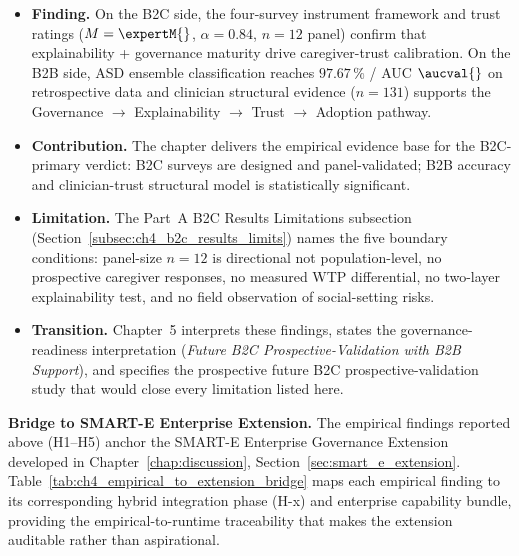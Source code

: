 \begin{itemize}[leftmargin=*, itemsep=2pt]
    \item \textbf{Finding.} On the B2C side, the four-survey instrument framework and trust ratings ($M = \expertM{}$, $\alpha = 0.84$, $n = 12$ panel) confirm that explainability + governance maturity drive caregiver-trust calibration. On the B2B side, ASD ensemble classification reaches $97.67\,\%$ / AUC $\aucval{}$ on retrospective data and clinician structural evidence ($n = 131$) supports the Governance $\to$ Explainability $\to$ Trust $\to$ Adoption pathway.
    \item \textbf{Contribution.} The chapter delivers the empirical evidence base for the B2C-primary verdict: B2C surveys are designed and panel-validated; B2B accuracy and clinician-trust structural model is statistically significant.
    \item \textbf{Limitation.} The Part~A B2C Results Limitations subsection (Section~\ref{subsec:ch4_b2c_results_limits}) names the five boundary conditions: panel-size $n = 12$ is directional not population-level, no prospective caregiver responses, no measured WTP differential, no two-layer explainability test, and no field observation of social-setting risks.
    \item \textbf{Transition.} Chapter~5 interprets these findings, states the governance-readiness interpretation (\emph{Future B2C Prospective-Validation with B2B Support}), and specifies the prospective future B2C prospective-validation study that would close every limitation listed here.
\end{itemize}

\noindent\textbf{Bridge to SMART-E Enterprise Extension.} The empirical findings reported above (H1--H5) anchor the SMART-E Enterprise Governance Extension developed in Chapter~\ref{chap:discussion}, Section~\ref{sec:smart_e_extension}. Table~\ref{tab:ch4_empirical_to_extension_bridge} maps each empirical finding to its corresponding hybrid integration phase (H-x) and enterprise capability bundle, providing the empirical-to-runtime traceability that makes the extension auditable rather than aspirational.

